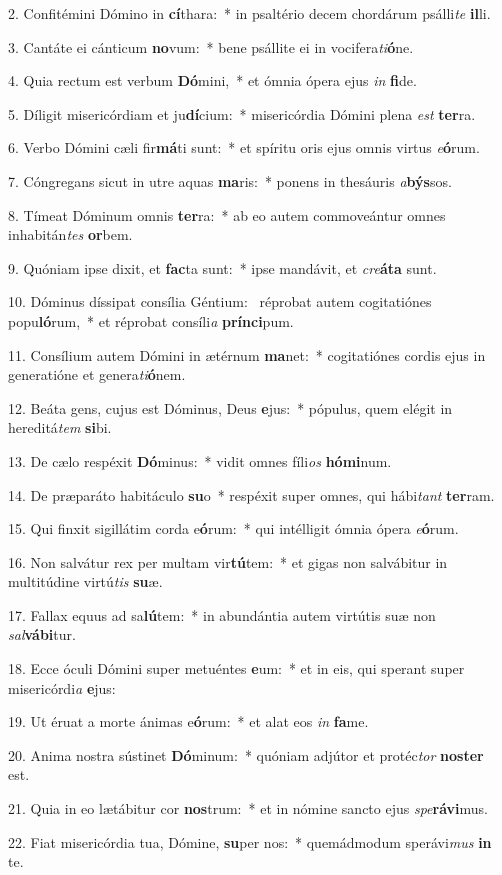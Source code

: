 2. Confitémini Dómino in \textbf{cí}thara:~*  in psaltério decem chordárum psálli\textit{te} \textbf{il}li.\

3. Cantáte ei cánticum \textbf{no}vum:~*  bene psállite ei in vocifera\textit{ti}\textbf{ó}ne.\

4. Quia rectum est verbum \textbf{Dó}mini,~*  et ómnia ópera ejus \textit{in} \textbf{fi}de.\

5. Díligit misericórdiam et ju\textbf{dí}cium:~*  misericórdia Dómini plena \textit{est} \textbf{ter}ra.\

6. Verbo Dómini cæli fir\textbf{má}ti sunt:~*  et spíritu oris ejus omnis virtus \textit{e}\textbf{ó}rum.\

7. Cóngregans sicut in utre aquas \textbf{ma}ris:~*  ponens in thesáuris \textit{a}\textbf{býs}sos.\

8. Tímeat Dóminum omnis \textbf{ter}ra:~*  ab eo autem commoveántur omnes inhabitán\textit{tes} \textbf{or}bem.\

9. Quóniam ipse dixit, et \textbf{fac}ta sunt:~*  ipse mandávit, et \textit{cre}\textbf{á}\textbf{ta} sunt.\

10. Dóminus díssipat consília Géntium: \dag\  réprobat autem cogitatiónes popu\textbf{ló}rum,~*  et réprobat consíli\textit{a} \textbf{prín}\textbf{ci}pum.\

11. Consílium autem Dómini in ætérnum \textbf{ma}net:~*  cogitatiónes cordis ejus in generatióne et genera\textit{ti}\textbf{ó}nem.\

12. Beáta gens, cujus est Dóminus, Deus \textbf{e}jus:~*  pópulus, quem elégit in hereditá\textit{tem} \textbf{si}bi.\

13. De cælo respéxit \textbf{Dó}minus:~*  vidit omnes fíli\textit{os} \textbf{hó}\textbf{mi}num.\

14. De præparáto habitáculo \textbf{su}o~*  respéxit super omnes, qui hábi\textit{tant} \textbf{ter}ram.\

15. Qui finxit sigillátim corda e\textbf{ó}rum:~*  qui intélligit ómnia ópera \textit{e}\textbf{ó}rum.\

16. Non salvátur rex per multam vir\textbf{tú}tem:~*  et gigas non salvábitur in multitúdine virtú\textit{tis} \textbf{su}æ.\

17. Fallax equus ad sa\textbf{lú}tem:~*  in abundántia autem virtútis suæ non \textit{sal}\textbf{vá}\textbf{bi}tur.\

18. Ecce óculi Dómini super metuéntes \textbf{e}um:~*  et in eis, qui sperant super misericórdi\textit{a} \textbf{e}jus:\

19. Ut éruat a morte ánimas e\textbf{ó}rum:~*  et alat eos \textit{in} \textbf{fa}me.\

20. Anima nostra sústinet \textbf{Dó}minum:~*  quóniam adjútor et protéc\textit{tor} \textbf{nos}\textbf{ter} est.\

21. Quia in eo lætábitur cor \textbf{nos}trum:~*  et in nómine sancto ejus \textit{spe}\textbf{rá}\textbf{vi}mus.\

22. Fiat misericórdia tua, Dómine, \textbf{su}per nos:~*  quemádmodum sperávi\textit{mus} \textbf{in} te.\

